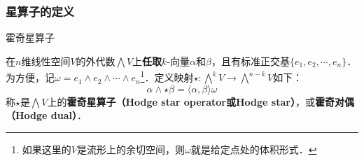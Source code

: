 





\subsubsection{星算子的定义}


\begin{definition}{霍奇星算子}

在$n$维线性空间$V$的外代数$\bigwedge V$上\textbf{任取}$k$-向量$\alpha$和$\beta$，且有标准正交基$\{e_1, e_2, \cdots, e_n\}$．为方便，记$\omega=e_1\wedge e_2\wedge \cdots\wedge e_n$\footnote{如果这里的$V$是流形上的余切空间，则$\omega$就是给定点处的体积形式．}．定义映射$\star:\bigwedge^k V \to \bigwedge^{n-k} V$如下：
\begin{equation}
\alpha\wedge \star\beta = \langle\alpha, \beta\rangle\omega
\end{equation}
称$\star$是$\bigwedge V$上的\textbf{霍奇星算子（Hodge star operator或Hodge star）}，或\textbf{霍奇对偶（Hodge dual）}．

\end{definition}


